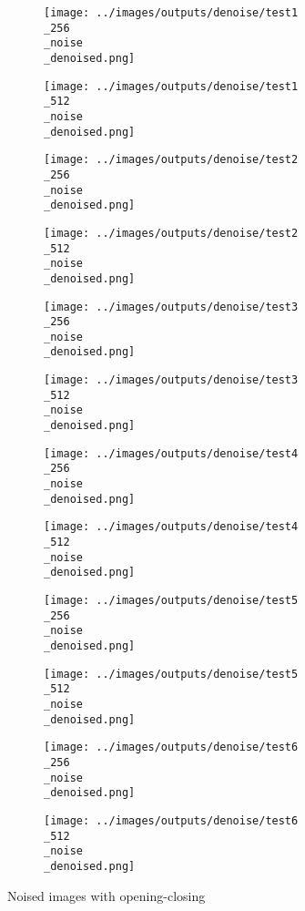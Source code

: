 \begin{figure}[!ht]
   \centering
\begin{subfigure}[t]{0.15\textwidth}
    \texttt{[image: ../images/outputs/denoise/test1\\\_256\\\_noise\\\_denoised.png]}
    \caption{}
    \centering
  \end{subfigure}
\begin{subfigure}[t]{0.15\textwidth}
    \texttt{[image: ../images/outputs/denoise/test1\\\_512\\\_noise\\\_denoised.png]}
    \caption{}
    \centering
  \end{subfigure}
\begin{subfigure}[t]{0.15\textwidth}
    \texttt{[image: ../images/outputs/denoise/test2\\\_256\\\_noise\\\_denoised.png]}
    \caption{}
    \centering
  \end{subfigure}
\begin{subfigure}[t]{0.15\textwidth}
    \texttt{[image: ../images/outputs/denoise/test2\\\_512\\\_noise\\\_denoised.png]}
    \caption{}
    \centering
  \end{subfigure}
\begin{subfigure}[t]{0.15\textwidth}
    \texttt{[image: ../images/outputs/denoise/test3\\\_256\\\_noise\\\_denoised.png]}
    \caption{}
    \centering
  \end{subfigure}
\begin{subfigure}[t]{0.15\textwidth}
    \texttt{[image: ../images/outputs/denoise/test3\\\_512\\\_noise\\\_denoised.png]}
    \caption{}
    \centering
  \end{subfigure}
\begin{subfigure}[t]{0.15\textwidth}
    \texttt{[image: ../images/outputs/denoise/test4\\\_256\\\_noise\\\_denoised.png]}
    \caption{}
    \centering
  \end{subfigure}
\begin{subfigure}[t]{0.15\textwidth}
    \texttt{[image: ../images/outputs/denoise/test4\\\_512\\\_noise\\\_denoised.png]}
    \caption{}
    \centering
  \end{subfigure}
\begin{subfigure}[t]{0.15\textwidth}
    \texttt{[image: ../images/outputs/denoise/test5\\\_256\\\_noise\\\_denoised.png]}
    \caption{}
    \centering
  \end{subfigure}
\begin{subfigure}[t]{0.15\textwidth}
    \texttt{[image: ../images/outputs/denoise/test5\\\_512\\\_noise\\\_denoised.png]}
    \caption{}
    \centering
  \end{subfigure}
\begin{subfigure}[t]{0.15\textwidth}
    \texttt{[image: ../images/outputs/denoise/test6\\\_256\\\_noise\\\_denoised.png]}
    \caption{}
    \centering
  \end{subfigure}
\begin{subfigure}[t]{0.15\textwidth}
    \texttt{[image: ../images/outputs/denoise/test6\\\_512\\\_noise\\\_denoised.png]}
    \caption{}
    \centering
  \end{subfigure}
 \caption{Noised images with opening-closing}
 \end{figure}
